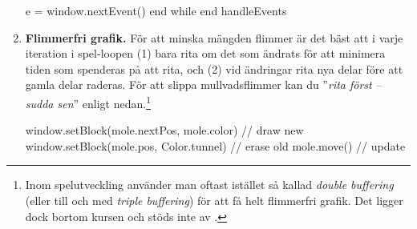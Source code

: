 \begin{enumerate}[leftmargin=*]
\begin{CodeSmall}
      e = window.nextEvent()
    end while
  end handleEvents
\end{CodeSmall}

\item \textbf{Flimmerfri grafik.} För att minska mängden flimmer  är det bäst att i varje iteration i spel-loopen (1) bara rita om det som ändrats för att minimera tiden som spenderas på att rita, och (2) vid ändringar rita nya delar före att gamla delar raderas. För att slippa mullvadsflimmer kan du ''\emph{rita först -- sudda sen}'' enligt nedan.\footnote{Inom spelutveckling använder man oftast istället så kallad \emph{double buffering} (eller till och med \emph{triple buffering}) för att få helt flimmerfri grafik. Det ligger dock bortom kursen och stöds inte av .}


\begin{CodeSmall}
window.setBlock(mole.nextPos, mole.color) // draw new
window.setBlock(mole.pos, Color.tunnel)   // erase old
mole.move()                               // update
\end{CodeSmall}

\end{enumerate}
